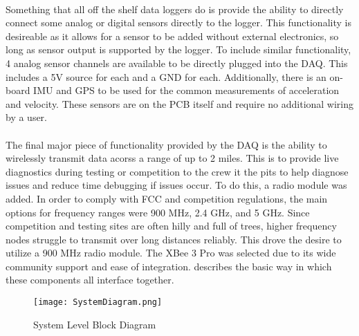 \paragraph{}
Something that all off the shelf data loggers do is provide the ability to directly connect some analog or digital sensors directly to the logger.
This functionality is desireable as it allows for a sensor to be added without external electronics, so long as sensor output is supported by the logger.
To include similar functionality, 4 analog sensor channels are available to be directly plugged into the DAQ.
This includes a 5V source for each and a GND for each.
Additionally, there is an on-board IMU and GPS to be used for the common measurements of acceleration and velocity.
These sensors are on the PCB itself and require no additional wiring by a user.

\paragraph{}
The final major piece of functionality provided by the DAQ is the ability to wirelessly transmit data acorss a range of up to 2 miles.
This is to provide live diagnostics during testing or competition to the crew it the pits to help diagnose issues and reduce time debugging if issues occur.
To do this, a radio module was added.
In order to comply with FCC and competition regulations, the main options for frequency ranges were 900 MHz, 2.4 GHz, and 5 GHz.
Since competition and testing sites are often hilly and full of trees, higher frequency nodes struggle to transmit over long distances reliably.
This drove the desire to utilize a 900 MHz radio module.
The XBee 3 Pro was selected due to its wide community support and ease of integration.
 describes the basic way in which these components all interface together.

\begin{figure}[H]
	\centering
	\texttt{[image: SystemDiagram.png]}
	\caption{System Level Block Diagram}
	\label{fig:SysDiagram}
\end{figure}
